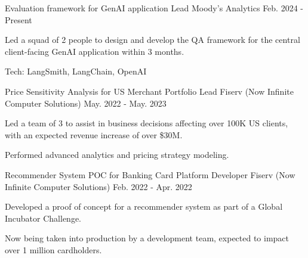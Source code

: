
\begin{cventries}

  \cventry
    {Evaluation framework for GenAI application} %
    {Lead} %
    {Moody's Analytics} %
    {Feb. 2024 - Present} %
    {
      \begin{cvitems} %
        \item {Led a squad of 2 people to design and develop the QA framework for the central client-facing GenAI application within 3 months.}
        \item {Tech: LangSmith, LangChain, OpenAI}
      \end{cvitems}
    }

  \cventry
    {Price Sensitivity Analysis for US Merchant Portfolio} %
    {Lead} %
    {Fiserv (Now Infinite Computer Solutions)} %
    {May. 2022 - May. 2023} %
    {
      \begin{cvitems} %
        \item {Led a team of 3 to assist in business decisions affecting over 100K US clients, with an expected revenue increase of over \$30M.}
        \item {Performed advanced analytics and pricing strategy modeling.}
      \end{cvitems}
    }

  \cventry
    {Recommender System POC for Banking Card Platform} %
    {Developer} %
    {Fiserv (Now Infinite Computer Solutions)} %
    {Feb. 2022 - Apr. 2022} %
    {
      \begin{cvitems} %
        \item {Developed a proof of concept for a recommender system as part of a Global Incubator Challenge.}
        \item {Now being taken into production by a development team, expected to impact over 1 million cardholders.}
      \end{cvitems}
    }


\end{cventries}
